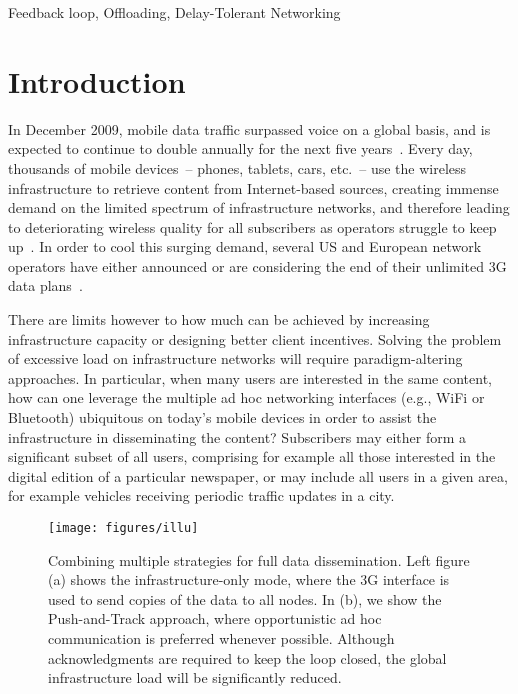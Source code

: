 \documentclass[preprint]{elsarticle}
\begin{document}
\begin{keyword}
Feedback loop, Offloading, Delay-Tolerant Networking
\end{keyword}

\maketitle


\section{Introduction}
\label{sec:introduction}

In December 2009, mobile data traffic surpassed voice on a global basis, and is expected to continue to double annually for the next five years~\cite{cisco_data,ericsson_data}. Every day, thousands of mobile devices~-- phones, tablets, cars, etc.~-- use the wireless infrastructure to retrieve content from Internet-based sources, creating immense demand on the limited spectrum of infrastructure networks, and therefore leading to deteriorating wireless quality for all subscribers as operators struggle to keep up~\cite{3g_overload}. In order to cool this surging demand, several US and European network operators have either announced or are considering the end of their unlimited 3G data plans~\cite{end_of_all_you_can_eat,3g_orange}.

There are limits however to how much can be achieved by increasing infrastructure capacity or designing better client incentives. Solving the problem of excessive load on infrastructure networks will require paradigm-altering approaches. In particular, when many users are interested in the same content, how can one leverage the multiple ad hoc networking interfaces (e.g., WiFi or Bluetooth) ubiquitous on today's mobile devices in order to assist the infrastructure in disseminating the content? Subscribers may either form a significant subset of all users, comprising for example all those interested in the digital edition of a particular newspaper, or may include all users in a given area, for example vehicles receiving periodic traffic updates in a city.

\begin{figure}
  \centering
  \texttt{[image: figures/illu]}
  \caption{Combining multiple strategies for full data dissemination. Left figure (a) shows the infrastructure-only mode, where the 3G interface is used to send copies of the data to all nodes. In (b), we show the Push-and-Track approach, where opportunistic ad hoc communication is preferred whenever possible. Although acknowledgments are required to keep the loop closed, the global infrastructure load will be significantly reduced.}
  \label{fig:illu}
\end{figure}
\end{document}
